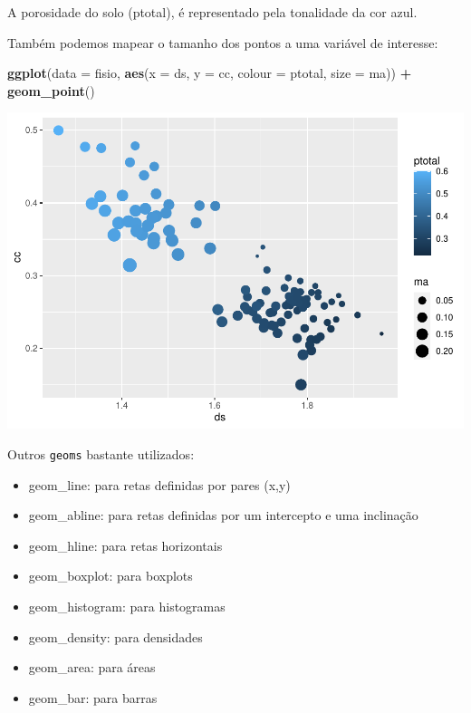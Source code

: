 \documentclass[
]{book}
\newenvironment{Shaded}{\begin{snugshade}}{\end{snugshade}}
\newcommand{\DataTypeTok}[1]{\textcolor[rgb]{0.13,0.29,0.53}{#1}}
\newcommand{\KeywordTok}[1]{\textcolor[rgb]{0.13,0.29,0.53}{\textbf{#1}}}
\newcommand{\NormalTok}[1]{#1}
\newcommand{\OperatorTok}[1]{\textcolor[rgb]{0.81,0.36,0.00}{\textbf{#1}}}
\newcommand{\StringTok}[1]{\textcolor[rgb]{0.31,0.60,0.02}{#1}}
\providecommand{\tightlist}{%
  \setlength{\itemsep}{0pt}\setlength{\parskip}{0pt}}
\begin{document}
A porosidade do solo (ptotal), é representado pela tonalidade da cor azul.

Também podemos mapear o tamanho dos pontos a uma variável de interesse:

\begin{Shaded}
\begin{Highlighting}[]
\KeywordTok{ggplot}\NormalTok{(}\DataTypeTok{data =}\NormalTok{ fisio, }\KeywordTok{aes}\NormalTok{(}\DataTypeTok{x =}\NormalTok{ ds, }\DataTypeTok{y =}\NormalTok{ cc, }\DataTypeTok{colour =}\NormalTok{ ptotal, }\DataTypeTok{size =}\NormalTok{ ma)) }\OperatorTok{+}
\StringTok{  }\KeywordTok{geom_point}\NormalTok{()}
\end{Highlighting}
\end{Shaded}

\includegraphics{TudodoR_files/figure-latex/unnamed-chunk-189-1.pdf}

Outros \texttt{geoms} bastante utilizados:

\begin{itemize}
\tightlist
\item
  geom\_line: para retas definidas por pares (x,y)
\item
  geom\_abline: para retas definidas por um intercepto e uma inclinação
\item
  geom\_hline: para retas horizontais
\item
  geom\_boxplot: para boxplots
\item
  geom\_histogram: para histogramas
\item
  geom\_density: para densidades
\item
  geom\_area: para áreas
\item
  geom\_bar: para barras
\end{itemize}
\end{document}

